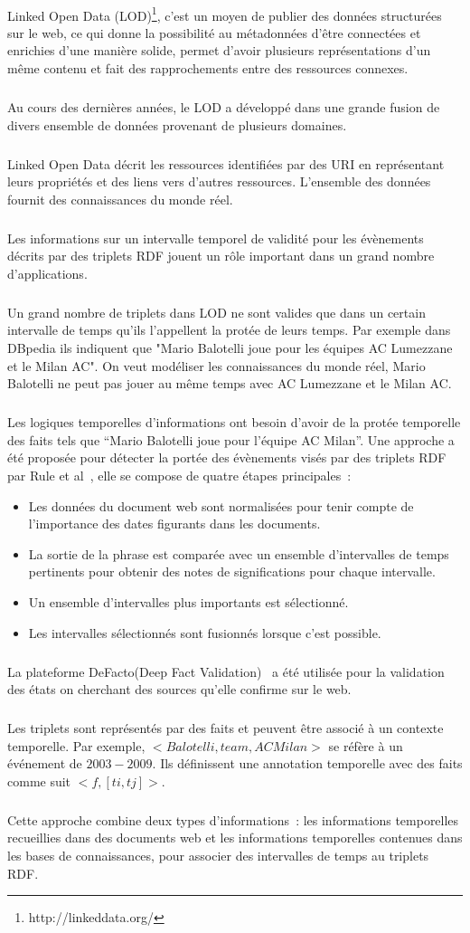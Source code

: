 \paragraph{}
Linked Open Data (LOD)\footnote{http://linkeddata.org/}, c'est un moyen de publier des données structurées sur le web, ce qui donne la possibilité au métadonnées d'être connectées et enrichies d'une manière solide, permet d'avoir plusieurs représentations d'un même contenu et fait des rapprochements entre des ressources connexes. 
\subparagraph{}
Au cours des dernières années, le LOD a développé dans une grande fusion de divers ensemble de données provenant de plusieurs domaines.
\subparagraph{}
Linked Open Data décrit les ressources identifiées par des URI en représentant leurs propriétés et des liens vers d’autres ressources.
L'ensemble des données fournit des connaissances du monde réel.
\subparagraph{}
Les informations sur un intervalle temporel de validité pour les évènements décrits par des triplets RDF jouent un rôle important dans un grand nombre d'applications.
\subparagraph{}
Un grand nombre de triplets dans LOD ne sont valides que dans un certain intervalle de temps qu'ils l'appellent la protée de leurs temps.
Par exemple dans DBpedia ils indiquent que "Mario Balotelli joue pour les équipes AC Lumezzane et le Milan AC". On veut modéliser les connaissances du monde réel, Mario Balotelli ne peut pas jouer au même temps avec AC Lumezzane et le Milan AC.
\subparagraph{}
Les logiques temporelles d'informations ont besoin d'avoir de la protée temporelle des faits tels que “Mario Balotelli joue pour l'équipe AC Milan”.
Une approche a été proposée pour détecter la portée des évènements visés par des triplets RDF par Rule et al~\cite{rula2013}, elle se compose de quatre étapes principales~:
\begin{itemize}
\item Les données du document web sont normalisées pour tenir compte de l’importance des dates figurants dans les documents.
\item La sortie de la phrase est comparée avec un ensemble d’intervalles de temps pertinents pour obtenir des notes de significations pour chaque intervalle.
\item Un ensemble d’intervalles plus importants est sélectionné.
\item Les intervalles sélectionnés sont fusionnés lorsque c’est possible.
\end{itemize}
\subparagraph{}
La plateforme DeFacto(Deep Fact Validation)~\cite{lehmann2012} a été utilisée pour la validation des états on cherchant des sources qu'elle confirme sur le web.
\subparagraph{}
Les triplets sont représentés par des faits et peuvent être associé à un contexte temporelle.
Par exemple, $<Balotelli, team, AC Milan>$ se réfère à un événement de $2003-2009$. 
Ils définissent une annotation temporelle avec des faits comme suit $<f, [ti,tj]>$.
\subparagraph{}
Cette approche combine deux types d'informations~: les informations temporelles recueillies dans des documents web et les informations temporelles contenues dans les bases de connaissances, pour associer des intervalles de temps au triplets RDF.
